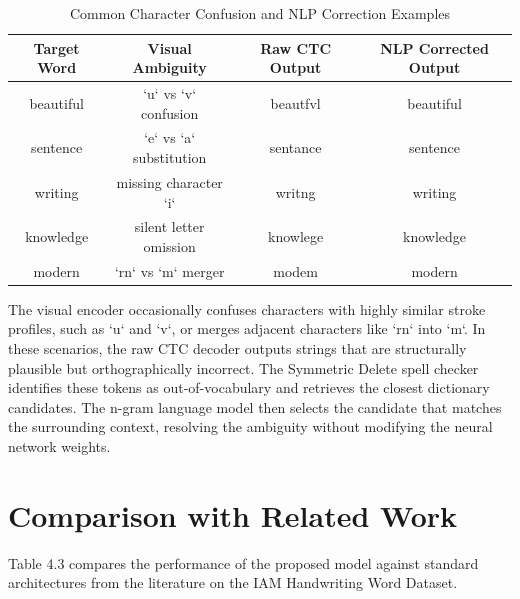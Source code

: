 \begin{table}[h!]
\centering
\caption{Common Character Confusion and NLP Correction Examples}
\label{tab:confusion}
\begin{tabular}{cccc}
    \toprule
    \textbf{Target Word} & \textbf{Visual Ambiguity} & \textbf{Raw CTC Output} & \textbf{NLP Corrected Output} \\
    \midrule
    beautiful & `u` vs `v` confusion & beautfvl & beautiful \\
    sentence & `e` vs `a` substitution & sentance & sentence \\
    writing & missing character `i` & writng & writing \\
    knowledge & silent letter omission & knowlege & knowledge \\
    modern & `rn` vs `m` merger & modem & modern \\
    \bottomrule
\end{tabular}
\end{table}

The visual encoder occasionally confuses characters with highly similar stroke profiles, such as `u` and `v`, or merges adjacent characters like `rn` into `m`. In these scenarios, the raw CTC decoder outputs strings that are structurally plausible but orthographically incorrect. The Symmetric Delete spell checker identifies these tokens as out-of-vocabulary and retrieves the closest dictionary candidates. The n-gram language model then selects the candidate that matches the surrounding context, resolving the ambiguity without modifying the neural network weights.

\section{Comparison with Related Work}
Table 4.3 compares the performance of the proposed model against standard architectures from the literature on the IAM Handwriting Word Dataset.

